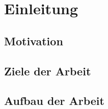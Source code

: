 \chapter{Einleitung}\label{chapter:Einleitung}


\section{Motivation}\label{Motivation}
\section{Ziele der Arbeit}\label{Ziele}
\section{Aufbau der Arbeit}\label{Aufbau}
